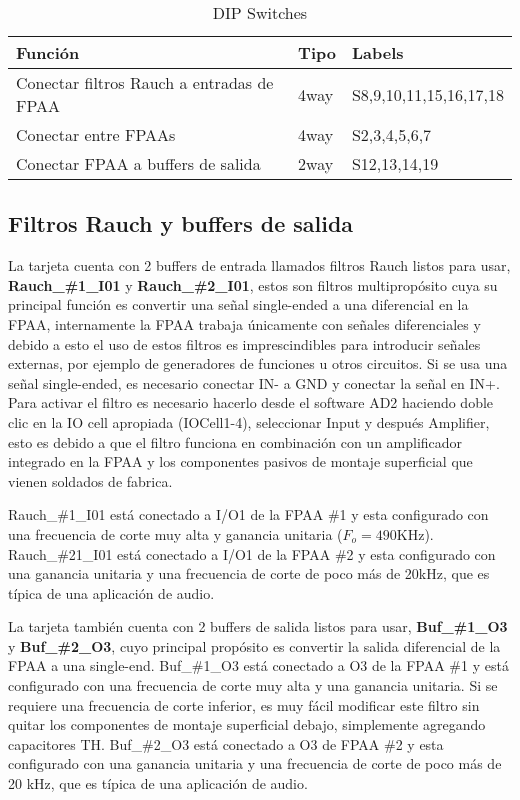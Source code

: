 	\begin{table}[!ht]
		\centering
		\begin{tabular}{|l|l|l|}
			\hline
			\textbf{Función} &  \textbf{Tipo} & \textbf{Labels}\\
			\hline
			Conectar filtros Rauch a entradas de FPAA 					& 4way 		& S8,9,10,11,15,16,17,18		\\
			\hline
			Conectar entre FPAAs 						& 4way 	& S2,3,4,5,6,7	\\
			\hline
			Conectar FPAA a buffers de salida 						& 2way 		& S12,13,14,19		\\
			\hline
		\end{tabular}
		\caption{DIP Switches}
		\label{tab:switches}
	\end{table}

	\subsection{Filtros Rauch y buffers de salida}
	
	La tarjeta cuenta con 2 buffers de entrada llamados filtros Rauch listos para usar, \textbf{Rauch\_\#1\_I01} y \textbf{Rauch\_\#2\_I01}, estos son filtros multipropósito cuya su principal función es convertir una señal single-ended a una diferencial en la FPAA, internamente la FPAA trabaja únicamente con señales diferenciales y debido a esto el uso de estos filtros es imprescindibles para introducir señales externas, por ejemplo de generadores de funciones u otros circuitos. Si se usa una señal single-ended, es necesario conectar IN- a GND y conectar la señal en IN+.
	Para activar el filtro es necesario hacerlo desde el software AD2 haciendo doble clic en la IO cell apropiada (IOCell1-4), seleccionar Input y después Amplifier, esto es debido a que el filtro funciona en combinación con un amplificador integrado en la FPAA y los componentes pasivos de montaje superficial que vienen soldados de fabrica.
	
	Rauch\_\#1\_I01 está conectado a I/O1 de la FPAA \#1 y esta configurado con una frecuencia de corte muy alta y ganancia unitaria ($F_{o} = 490$KHz). Rauch\_\#21\_I01 está conectado a I/O1 de la FPAA \#2 y esta configurado con una ganancia unitaria y una frecuencia de corte de poco más de 20kHz, que es típica de una aplicación de audio. 

	La tarjeta también cuenta con 2 buffers de salida listos para usar, \textbf{Buf\_\#1\_O3} y  \textbf{Buf\_\#2\_O3}, cuyo principal propósito es convertir la salida diferencial de la FPAA a una single-end. 
	Buf\_\#1\_O3 está conectado a O3 de la FPAA \#1 y está configurado con una frecuencia de corte muy alta y una ganancia unitaria. Si se requiere una frecuencia de corte inferior, es muy fácil modificar este filtro sin quitar los componentes de montaje superficial debajo, simplemente agregando capacitores TH. Buf\_\#2\_O3 está conectado a O3 de FPAA \#2 y esta configurado con una ganancia unitaria y una frecuencia de corte de poco más de 20 kHz, que es típica de una aplicación de audio. 
	

